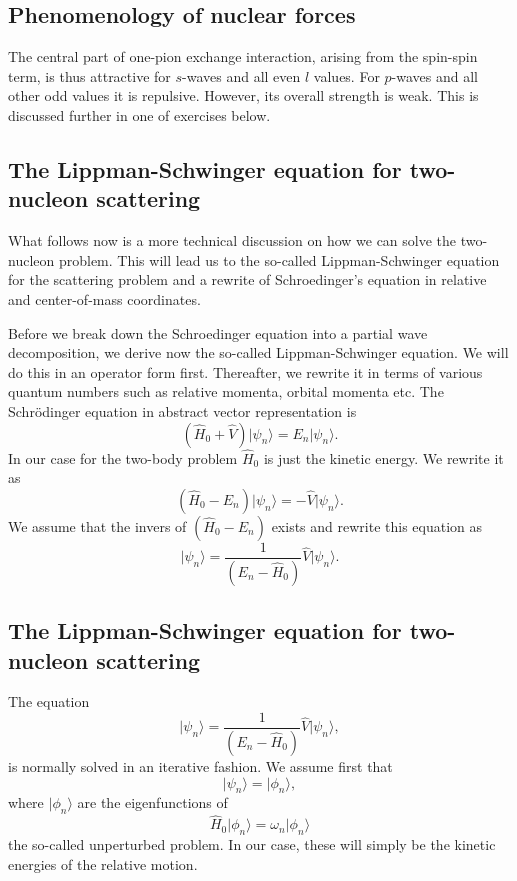\documentclass[%
twoside,                 %
final,                   %
10pt]{article}
\begin{document}
\subsection{Phenomenology of nuclear forces}
\begin{block}{}

The central part of one-pion exchange interaction, arising from the spin-spin term,  
is thus attractive for $s$-waves and all even $l$ values. For $p$-waves and all other odd values
it is repulsive. However, its overall strength is weak. This is discussed further in one of exercises below.

\end{block}

\subsection{The Lippman-Schwinger equation for two-nucleon scattering}
\begin{block}{}
What follows now is a more technical discussion on how we can solve the two-nucleon problem.
This will lead us to the so-called Lippman-Schwinger equation for the scattering problem and a rewrite of Schroedinger's equation in relative and center-of-mass coordinates. 


Before we break down the Schroedinger equation into a partial wave decomposition, we derive now the so-called Lippman-Schwinger equation. We will do this in an operator form first.
Thereafter, we rewrite it in terms of various quantum numbers such as relative momenta, orbital momenta etc. 
The Schr\"odinger equation in abstract vector representation is
\[
  \left( \hat{H}_0 + \hat{V} \right) \vert \psi_n \rangle = E_n \vert\psi_n \rangle. 
\]
In our case for the two-body problem $\hat{H}_0$ is just the kinetic energy. 
We rewrite it as 
\[
\left( \hat{H}_0 -E_n \right)\vert\psi_n \rangle =-\hat{V}\vert \psi_n \rangle . 
\]
We assume that the invers of $\left( \hat{H}_0 -E_n\right)$ exists and rewrite this equation as
\[
\vert\psi_n \rangle =\frac{1}{\left( E_n -\hat{H}_0\right)}\hat{V}\vert \psi_n \rangle . 
\]
\end{block}

\subsection{The Lippman-Schwinger equation for two-nucleon scattering}
\begin{block}{}
The equation
\[
\vert \psi_n \rangle =\frac{1}{\left( E_n -\hat{H}_0\right)}\hat{V}\vert \psi_n \rangle,
\]
is normally solved in an iterative fashion. 
We assume first that
\[
\vert\psi_n \rangle = \vert\phi_n \rangle,
\] 
where $\vert\phi_n \rangle$ are the eigenfunctions of 
\[
\hat{H}_0\vert \phi_n \rangle=\omega_n\vert \phi_n \rangle
\]
the so-called unperturbed problem. In our case, these will simply be the kinetic energies of the relative motion. 
\end{block}
\end{document}
